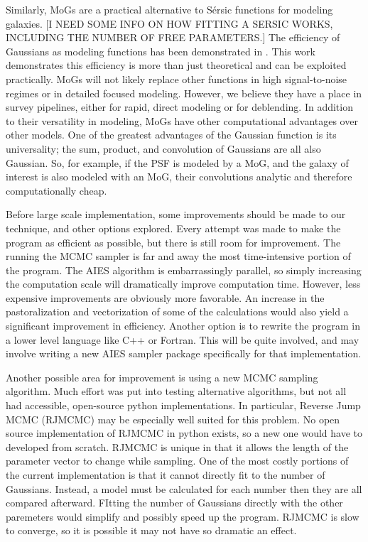 \documentclass[authoryear, 12pt, 5p, times]{elsarticle}
\begin{document}
Similarly, MoGs are a practical alternative to S\'{e}rsic functions for modeling galaxies. [I NEED SOME INFO ON HOW FITTING A SERSIC WORKS, INCLUDING THE NUMBER OF FREE PARAMETERS.] The efficiency of Gaussians as modeling functions has been demonstrated in \cite{mog}. This work demonstrates this efficiency is more than just theoretical and can be exploited practically. MoGs will not likely replace other functions in high signal-to-noise regimes or in detailed focused modeling. However, we believe they have a place in survey pipelines, either for rapid, direct modeling or for deblending. In addition to their versatility in modeling, MoGs have other computational advantages over other models. One of the greatest advantages of the Gaussian function is its universality; the sum,  product, and convolution of Gaussians are all also Gaussian. So, for example, if the PSF is modeled by a MoG, and the galaxy of interest is also modeled with an MoG, their convolutions analytic and therefore computationally cheap. 



Before large scale implementation, some improvements should be made to our technique, and other options explored. Every attempt was made to make the program as efficient as possible, but there is still room for improvement. The running the MCMC sampler is far and away the most time-intensive portion of the program. The AIES algorithm is embarrassingly parallel, so simply increasing the computation scale will dramatically improve computation time. However, less expensive improvements are obviously more favorable. An increase in the pastoralization and vectorization of some of the calculations would also yield a significant improvement in efficiency. Another option is to rewrite the program in a lower level language like C++ or Fortran. This will be quite involved, and may involve writing a new AIES sampler package specifically for that implementation. 

Another possible area for improvement is using a new MCMC sampling algorithm. Much effort was put into testing alternative algorithms, but not all had accessible, open-source python implementations. In particular, Reverse Jump MCMC (RJMCMC) may be especially well suited for this problem. No open source implementation of RJMCMC in python exists, so a new one would have to developed from scratch. RJMCMC is unique in that it allows the length of the parameter vector to change while sampling. One of the most costly portions of the current implementation is that it cannot directly fit to the number of Gaussians. Instead, a model must be calculated for each number then they are all compared afterward. FItting the number of Gaussians directly with the other paremeters would simplify and possibly speed up the program. RJMCMC is slow to converge, so it is possible it may not have so dramatic an effect. 
\end{document}
